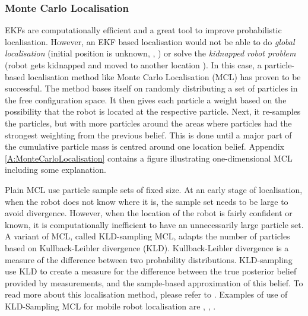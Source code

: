 \subsubsection{Monte Carlo Localisation}
EKFs are computationally efficient and a great tool to improve probabilistic localisation. However, an EKF based localisation would not be able to do \textit{global localisation} (initial position is unknown, \cite{SiegwartRoland2011Itam}, \cite{ThrunSebastian2005Pr}) or solve the \textit{kidnapped robot problem} (robot gets kidnapped and moved to another location \cite{SiegwartRoland2011Itam} \cite{ThrunSebastian2005Pr}). In this case, a particle-based localisation method like Monte Carlo Localisation (MCL) has proven to be successful. The method bases itself on randomly distributing a set of particles in the free configuration space. It then gives each particle a weight based on the possibility that the robot is located at the respective particle. Next, it re-samples the particles, but with more particles around the areas where particles had the strongest weighting from the previous belief. This is done until a major part of the cumulative particle mass is centred around one location belief. Appendix \ref{A:MonteCarloLocalisation} contains a figure illustrating one-dimensional MCL including some explanation.

Plain MCL use particle sample sets of fixed size. At an early stage of localisation, when the robot does not know where it is, the sample set needs to be large to avoid divergence. However, when the location of the robot is fairly confident or known, it is computationally inefficient to have an unnecessarily large particle set. A variant of MCL, called KLD-sampling MCL, adapts the number of particles based on Kullback-Leibler divergence (KLD). Kullback-Leibler divergence is a measure of the difference between two probability distributions. KLD-sampling use KLD to create a measure for the difference between the true posterior belief provided by measurements, and the sample-based approximation of this belief. To read more about this localisation method, please refer to \cite{ThrunSebastian2005Pr}. Examples of use of KLD-Sampling MCL for mobile robot localisation are \cite{Wasisto2019}, \cite{NAV2020}, \cite{Song2017}.

